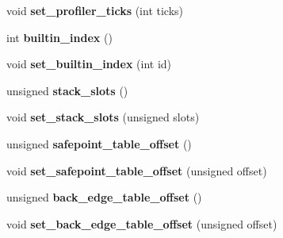 \begin{DoxyCompactItemize}
\item 
void {\bfseries set\+\_\+profiler\+\_\+ticks} (int ticks)\hypertarget{classv8_1_1internal_1_1_code_a2c300beee37a7a8268a8ff63b6e41579}{}\label{classv8_1_1internal_1_1_code_a2c300beee37a7a8268a8ff63b6e41579}

\item 
int {\bfseries builtin\+\_\+index} ()\hypertarget{classv8_1_1internal_1_1_code_aad03e3d8f814849147c8ce49f77c9e2d}{}\label{classv8_1_1internal_1_1_code_aad03e3d8f814849147c8ce49f77c9e2d}

\item 
void {\bfseries set\+\_\+builtin\+\_\+index} (int id)\hypertarget{classv8_1_1internal_1_1_code_a987c4cb0f7dd6ed7d6e00342be26df9d}{}\label{classv8_1_1internal_1_1_code_a987c4cb0f7dd6ed7d6e00342be26df9d}

\item 
unsigned {\bfseries stack\+\_\+slots} ()\hypertarget{classv8_1_1internal_1_1_code_a06e268e34e4f06ae063011200cf5b4dd}{}\label{classv8_1_1internal_1_1_code_a06e268e34e4f06ae063011200cf5b4dd}

\item 
void {\bfseries set\+\_\+stack\+\_\+slots} (unsigned slots)\hypertarget{classv8_1_1internal_1_1_code_ad0aa1c89b7f113da0000fc953adee62c}{}\label{classv8_1_1internal_1_1_code_ad0aa1c89b7f113da0000fc953adee62c}

\item 
unsigned {\bfseries safepoint\+\_\+table\+\_\+offset} ()\hypertarget{classv8_1_1internal_1_1_code_a1e5fc5ff12afabdbcac911aed304004d}{}\label{classv8_1_1internal_1_1_code_a1e5fc5ff12afabdbcac911aed304004d}

\item 
void {\bfseries set\+\_\+safepoint\+\_\+table\+\_\+offset} (unsigned offset)\hypertarget{classv8_1_1internal_1_1_code_aa8cc331093fa8205a998d8ca5fd5c865}{}\label{classv8_1_1internal_1_1_code_aa8cc331093fa8205a998d8ca5fd5c865}

\item 
unsigned {\bfseries back\+\_\+edge\+\_\+table\+\_\+offset} ()\hypertarget{classv8_1_1internal_1_1_code_ad592e3265a49a2888496818936fafa98}{}\label{classv8_1_1internal_1_1_code_ad592e3265a49a2888496818936fafa98}

\item 
void {\bfseries set\+\_\+back\+\_\+edge\+\_\+table\+\_\+offset} (unsigned offset)\hypertarget{classv8_1_1internal_1_1_code_a29cd5577ecfc9518ca2f93da18487cd2}{}\label{classv8_1_1internal_1_1_code_a29cd5577ecfc9518ca2f93da18487cd2}


\end{DoxyCompactItemize}
